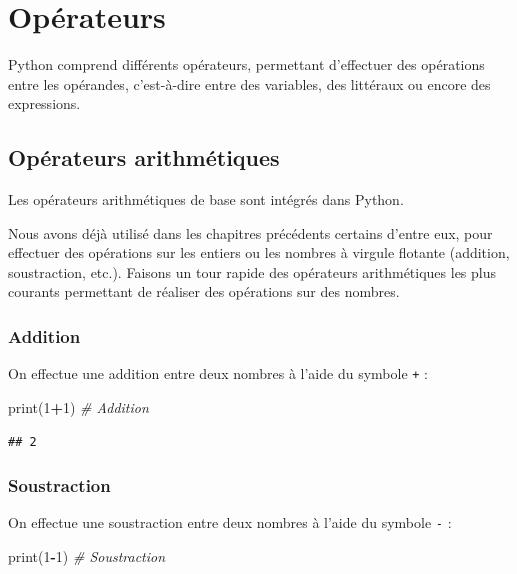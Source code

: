 \documentclass[12pt,]{book}
\newenvironment{Shaded}{\begin{snugshade}}{\end{snugshade}}
\newcommand{\DecValTok}[1]{\textcolor[rgb]{0.00,0.00,0.81}{#1}}
\newcommand{\CommentTok}[1]{\textcolor[rgb]{0.56,0.35,0.01}{\textit{#1}}}
\newcommand{\OperatorTok}[1]{\textcolor[rgb]{0.81,0.36,0.00}{\textbf{#1}}}
\newcommand{\BuiltInTok}[1]{#1}
\newcommand{\NormalTok}[1]{#1}
\numberwithin{equation}{section}
\numberwithin{countremarque}{section}
\begin{document}
\chapter{Opérateurs}\label{operateurs}

Python comprend différents opérateurs, permettant d'effectuer des
opérations entre les opérandes, c'est-à-dire entre des variables, des
littéraux ou encore des expressions.

\section{Opérateurs arithmétiques}\label{operateurs-arithmetiques}

Les opérateurs arithmétiques de base sont intégrés dans Python.

Nous avons déjà utilisé dans les chapitres précédents certains d'entre
eux, pour effectuer des opérations sur les entiers ou les nombres à
virgule flotante (addition, soustraction, etc.). Faisons un tour rapide
des opérateurs arithmétiques les plus courants permettant de réaliser
des opérations sur des nombres.

\subsection{Addition}\label{addition}

On effectue une addition entre deux nombres à l'aide du symbole
\texttt{+} :

\begin{Shaded}
\begin{Highlighting}[]
\BuiltInTok{print}\NormalTok{(}\DecValTok{1}\OperatorTok{+}\DecValTok{1}\NormalTok{) }\CommentTok{# Addition}
\end{Highlighting}
\end{Shaded}

\begin{lstlisting}
## 2
\end{lstlisting}

\subsection{Soustraction}\label{soustraction}

On effectue une soustraction entre deux nombres à l'aide du symbole
\texttt{-} :

\begin{Shaded}
\begin{Highlighting}[]
\BuiltInTok{print}\NormalTok{(}\DecValTok{1}\OperatorTok{-}\DecValTok{1}\NormalTok{) }\CommentTok{# Soustraction}
\end{Highlighting}
\end{Shaded}
\end{document}
